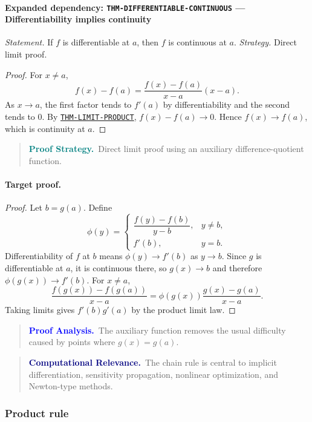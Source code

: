 \documentclass[10pt]{article}
\newcommand{\pidraw}[1]{\begingroup\urlstyle{tt}\nolinkurl{#1}\endgroup}
\newcommand{\pidref}[1]{\hyperref[prf:#1]{\pidraw{#1}}}
\newcommand{\pid}[1]{\pidref{#1}}
\theoremstyle{definition}
\theoremstyle{remark}
\newenvironment{proofstrategy}
{\begin{quote}\small\noindent\textbf{\textcolor{teal}{Proof Strategy.}}\ }
{\end{quote}}
\newenvironment{proofanalysis}
{\begin{quote}\small\noindent\textbf{\textcolor{blue}{Proof Analysis.}}\ }
{\end{quote}}
\newenvironment{computationalrelevance}
{\begin{quote}\small\noindent\textbf{\textcolor{navy}{Computational Relevance.}}\ }
{\end{quote}}
\begin{document}
\paragraph{Expanded dependency: \pidraw{THM-DIFFERENTIABLE-CONTINUOUS} --- Differentiability implies continuity}
\textit{Statement.} If $f$ is differentiable at $a$, then $f$ is continuous at $a$.
\textit{Strategy.} Direct limit proof.
\begin{proof}For $x\ne a$,
\[
f(x)-f(a)=
\frac{f(x)-f(a)}{x-a}(x-a).
\]
As $x\to a$, the first factor tends to $f'(a)$ by differentiability and the
second tends to $0$. By \pid{THM-LIMIT-PRODUCT},
$f(x)-f(a)\to0$. Hence $f(x)\to f(a)$, which is continuity at $a$.\end{proof}

\begin{proofstrategy}Direct limit proof using an auxiliary difference-quotient function.\end{proofstrategy}

\paragraph{Target proof.}

\begin{proof}

Let $b=g(a)$. Define
\[
\phi(y)=
\begin{cases}
\dfrac{f(y)-f(b)}{y-b},&y\ne b,\\[4pt]
f'(b),&y=b.
\end{cases}
\]
Differentiability of $f$ at $b$ means $\phi(y)\to f'(b)$ as $y\to b$.
Since $g$ is differentiable at $a$, it is continuous there, so $g(x)\to b$ and
therefore $\phi(g(x))\to f'(b)$. For $x\ne a$,
\[
\frac{f(g(x))-f(g(a))}{x-a}
=
\phi(g(x))\frac{g(x)-g(a)}{x-a}.
\]
Taking limits gives $f'(b)g'(a)$ by the product limit law.

\end{proof}

\begin{proofanalysis}The auxiliary function removes the usual difficulty caused by points where $g(x)=g(a)$.\end{proofanalysis}

\begin{computationalrelevance}The chain rule is central to implicit differentiation, sensitivity propagation, nonlinear optimization, and Newton-type methods.\end{computationalrelevance}

\subsubsection{Product rule}
\end{document}
